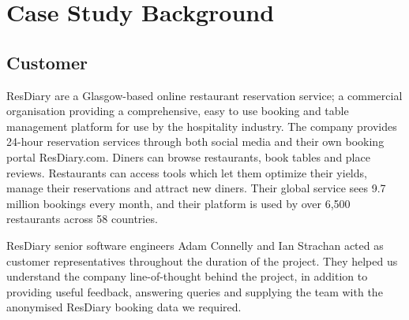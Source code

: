 \documentclass{l3proj}
\begin{document}
\newpage



\section{Case Study Background}
\label{sec:background}

\subsection{Customer}
\label{sec:customer}


ResDiary are a Glasgow-based online restaurant reservation service; a commercial organisation providing a comprehensive, easy to use booking and table management platform for use by the hospitality industry. The company provides 24-hour reservation services through both social media and their own booking portal ResDiary.com. Diners can browse restaurants, book tables and place reviews. Restaurants can access tools which let them optimize their yields, manage their reservations and attract new diners. Their global service sees 9.7 million bookings every month, and their platform is used by over 6,500 restaurants across 58 countries. 

ResDiary senior software engineers Adam Connelly and Ian Strachan acted as customer representatives throughout the duration of the project. They helped us understand the company line-of-thought behind the project, in addition to providing useful feedback, answering queries and supplying the team with the anonymised ResDiary booking data we required.
\end{document}
